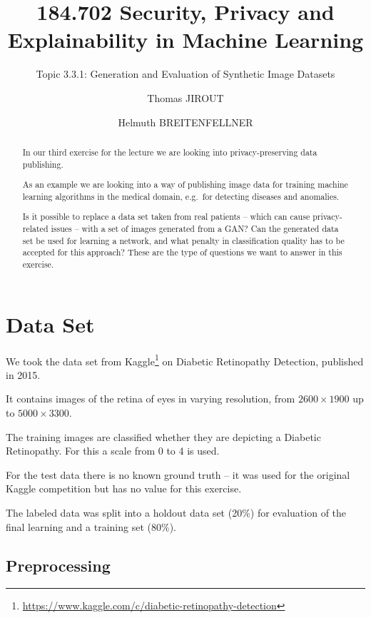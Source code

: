 \documentclass[sigconf,nonacm]{acmart}
\begin{document}
\title{184.702 Security, Privacy and Explainability in Machine Learning}
\subtitle{Topic 3.3.1: Generation and Evaluation
of Synthetic Image Datasets}
\author{Thomas JIROUT}
\author{Helmuth BREITENFELLNER}
\begin{abstract}
In our third exercise for the lecture we are looking into
privacy-preserving data publishing.

As an example we are looking into a way of publishing image
data for training machine learning algorithms in the medical
domain, e.g.\ for
detecting diseases and anomalies.

Is it possible to replace a data set taken from real patients --
which can cause privacy-related issues -- with a set of images
generated from a GAN?
Can the generated data set be used for learning a network,
and what penalty in classification quality has to be
accepted for this approach?
These are the type of questions we want to answer in this exercise.
\end{abstract}
\maketitle

\section{Data Set}

We took the data set from Kaggle\footnote{\url{https://www.kaggle.com/c/diabetic-retinopathy-detection}}
on
Diabetic Retinopathy Detection, published in 2015.

It contains images of the retina of eyes in varying resolution,
from $2600\times1900$ up to $5000\times3300$.

The training images are classified whether they are
depicting a Diabetic Retinopathy.
For this a scale from 0 to 4 is used.

For the test data there is no known ground truth -- it
was used for the original Kaggle
competition but has no value for this exercise.

The labeled data was split into a holdout data set (20\%)
for evaluation
of the final learning and a training set (80\%).

\subsection{Preprocessing}
\end{document}
